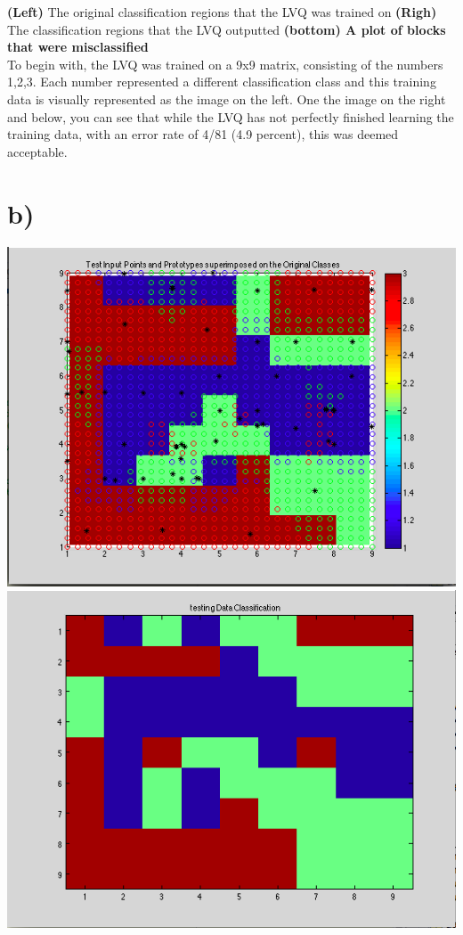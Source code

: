 \documentclass[epsfig]{article}
\begin{document}
\textbf{(Left)} The original classification regions that the LVQ was trained on \textbf{(Righ)} The classification regions that the LVQ outputted \textbf{(bottom) A plot of blocks that were misclassified}\\
\newline
To begin with, the LVQ was trained on a 9x9 matrix, consisting of the numbers 1,2,3. Each number represented a different classification class and this training data is visually represented as the image on the left. One the image on the right and below, you can see that while the LVQ has not perfectly finished learning the training data, with an error rate of 4/81 (4.9 percent), this was deemed acceptable. 
\section*{b)}
\begin{center}
\includegraphics[scale=0.42]{pic4}
\includegraphics[scale=0.42]{pic5}
\end{center}
\end{document}

